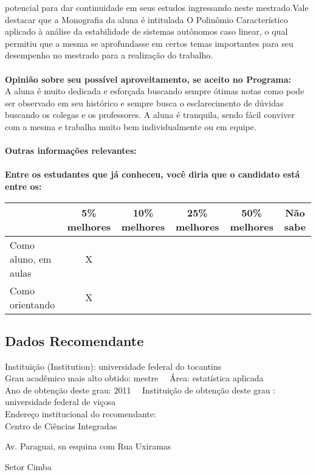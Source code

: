 \documentclass[11pt]{article}
\begin{document}
potencial para dar continuidade em seus estudos ingressando neste mestrado.Vale destacar que a Monografia da aluna é intitulada O Polinômio Característico aplicado à análise da estabilidade de sistemas autônomos caso linear, o qual permitiu que a mesma se aprofundasse em certos temas importantes para seu desempenho no mestrado para a realização do trabalho.\\
\\
\textbf{Opinião sobre seu possível aproveitamento, se aceito no Programa:}
\\A aluna é muito dedicada e esforçada buscando sempre ótimas notas como pode ser observado em seu histórico e sempre busca o esclarecimento de 
dúvidas buscando os colegas e os professores. A aluna é tranquila, sendo fácil conviver com a mesma e trabalha muito bem 
individualmente ou em equipe.\\ 
\\
\textbf{Outras informações relevantes:} \\
\\[0.3cm]
\textbf{Entre os estudantes que já conheceu, você diria que o candidato está entre os:}
\\
\begin{tabular}{|l|c|c|c|c|c|}
\hline
 & 5\% melhores & 10\% melhores & 25\% melhores & 50\% melhores & Não sabe \\
\hline
Como aluno, em aulas & X &  &  &  & \\
\hline
Como orientando & X &  &  &  & \\
\hline
\end{tabular}
\subsection*{Dados Recomendante} 
	Instituição (Institution): universidade federal do tocantins
\\ 
	Grau acadêmico mais alto obtido: mestre
	\ \ Área: estatística aplicada
	\\
	Ano de obtenção deste grau: 2011
	\ \ 
	Instituição de obtenção deste grau : universidade federal de viçosa
	\\ 
	Endereço institucional do recomendante: \\ Centro de Ciências Integradas

Av. Paraguai, sn  esquina com Rua Uxiramas

Setor Cimba
\end{document}
